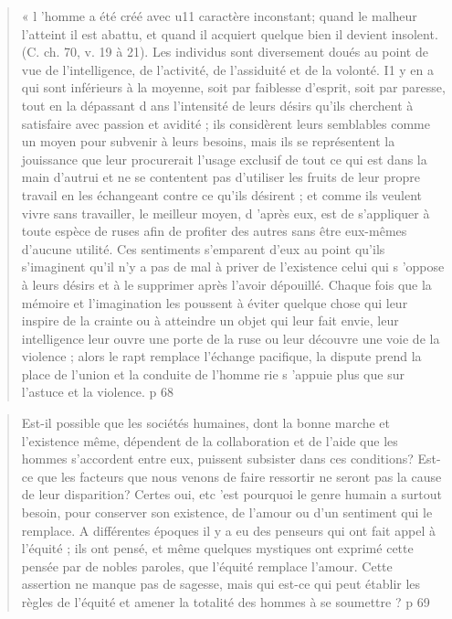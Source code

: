 \begin{quote}
    
    « l 'homme
a été créé avec u11 caractère inconstant; quand le malheur l'atteint
il est abattu, et quand il acquiert quelque bien il devient insolent.
(C. ch. 70, v. 19 à 21). Les individus sont diversement doués au point
de vue de l'intelligence, de l'activité, de l'assiduité et de la volonté. I1 y
en a qui sont inférieurs à la moyenne, soit par faiblesse d'esprit, soit
par paresse, tout en la dépassant d ans l'intensité de leurs désirs qu'ils
cherchent à satisfaire avec passion et avidité ; ils considèrent leurs
semblables comme un moyen pour subvenir à leurs besoins, mais ils
se représentent la jouissance que leur procurerait l'usage exclusif de
tout ce qui est dans la main d'autrui et ne se contentent pas d'utiliser
les fruits de leur propre travail en les échangeant contre ce qu'ils désirent ;
et comme ils veulent vivre sans travailler, le meilleur moyen, d 'après
eux, est de s'appliquer à toute espèce de ruses afin de profiter des autres
sans être eux-mêmes d'aucune utilité. Ces sentiments s'emparent d'eux
au point qu'ils s'imaginent qu'il n'y a pas de mal à priver de l'existence
celui qui s 'oppose à leurs désirs et à le supprimer après l'avoir
dépouillé. Chaque fois que la mémoire et l'imagination les poussent à
éviter quelque chose qui leur inspire de la crainte ou à atteindre un
objet qui leur fait envie, leur intelligence leur ouvre une porte de la
ruse ou leur découvre une voie de la violence ; alors le rapt remplace
l'échange pacifique, la dispute prend la place de l'union et la conduite
de l'homme rie s 'appuie plus que sur l'astuce et la violence.
p 68
\end{quote}

\begin{quote}
   Est-il possible que les sociétés humaines, dont la bonne marche et
l'existence même, dépendent de la collaboration et de l'aide que les
hommes s'accordent entre eux, puissent subsister dans ces conditions?
Est-ce que les facteurs que nous venons de faire ressortir ne seront pas
la cause de leur disparition? Certes oui, etc 'est pourquoi le genre humain
a surtout besoin, pour conserver son existence, de l'amour ou d'un
sentiment qui le remplace.
A différentes époques il y a eu des penseurs qui ont fait appel à
l'équité ; ils ont pensé, et même quelques mystiques ont exprimé cette
pensée par de nobles paroles, que l'équité remplace l'amour. Cette
assertion ne manque pas de sagesse, mais qui est-ce qui peut établir les
règles de l'équité et amener la totalité des hommes à se soumettre ?
p 69
\end{quote}

